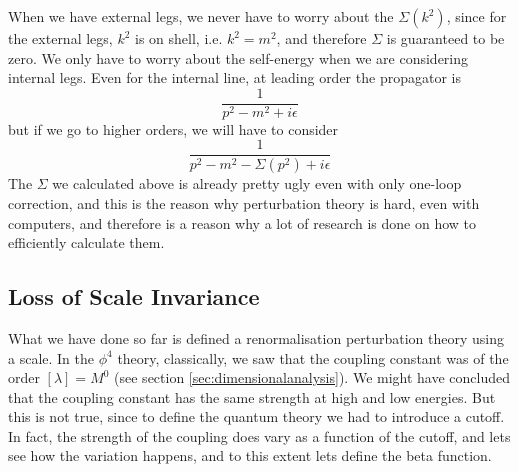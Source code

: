 \documentclass[11pt]{article}
\numberwithin{equation}{section}
\begin{document}
When we have external legs, we never have to worry about the \(\Sigma(k^2)\), since for the external legs, \(k^2\) is on shell, i.e. \(k^2 = m^2\), and therefore \(\Sigma\) is guaranteed to be zero. We only have to worry about the self-energy when we are considering internal legs. Even for the internal line, at leading order the propagator is 
\begin{equation*}
    \frac{1}{p^2 - m^2 + i\epsilon}
\end{equation*}
but if we go to higher orders, we will have to consider 
\begin{equation*}
    \frac{1}{p^2 - m^2 - \Sigma(p^2) + i\epsilon}
\end{equation*}
The \(\Sigma\) we calculated above is already pretty ugly even with only one-loop correction, and this is the reason why perturbation theory is hard, even with computers, and therefore is a reason why a lot of research is done on how to efficiently calculate them.

\subsection{Loss of Scale Invariance}
What we have done so far is defined a renormalisation perturbation theory using a scale. In the \(\phi^4\) theory, classically, we saw that the coupling constant was of the order \([\lambda] = M^0\) (see section \ref{sec:dimensionalanalysis}). We might have concluded that the coupling constant has the same strength at high and low energies. But this is not true, since to define the quantum theory we had to introduce a cutoff. In fact, the strength of the coupling does vary as a function of the cutoff, and lets see how the variation happens, and to this extent lets define the beta function.\\
\end{document}
